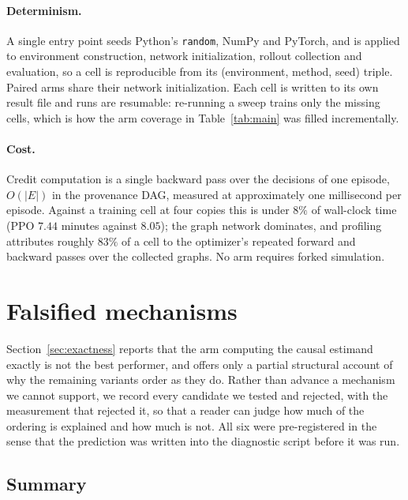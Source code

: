 \documentclass[review,authoryear,3p,times]{elsarticle}
\begin{document}
\paragraph{Determinism.} A single entry point seeds Python's \texttt{random},
NumPy and PyTorch, and is applied to environment construction, network
initialization, rollout collection and evaluation, so a cell is reproducible
from its (environment, method, seed) triple. Paired arms share their network
initialization. Each cell is written to its own result file and runs are
resumable: re-running a sweep trains only the missing cells, which is how the
arm coverage in Table~\ref{tab:main} was filled incrementally.

\paragraph{Cost.} Credit computation is a single backward pass over the
decisions of one episode, $O(|E|)$ in the provenance DAG, measured at
approximately one millisecond per episode. Against a training cell at four
copies this is under $8\%$ of wall-clock time (PPO $7.44$ minutes against
$8.05$); the graph network dominates, and profiling attributes roughly $83\%$
of a cell to the optimizer's repeated forward and backward passes over the
collected graphs. No arm requires forked simulation.

\section{Falsified mechanisms}
\label{app:falsified}

Section~\ref{sec:exactness} reports that the arm computing the causal estimand
exactly is not the best performer, and offers only a partial structural account
of why the remaining variants order as they do. Rather than advance a mechanism
we cannot support, we record every candidate we tested and rejected, with the
measurement that rejected it, so that a reader can judge how much of the
ordering is explained and how much is not. All six were pre-registered in the sense that the
prediction was written into the diagnostic script before it was run.

\subsection{Summary}
\end{document}
